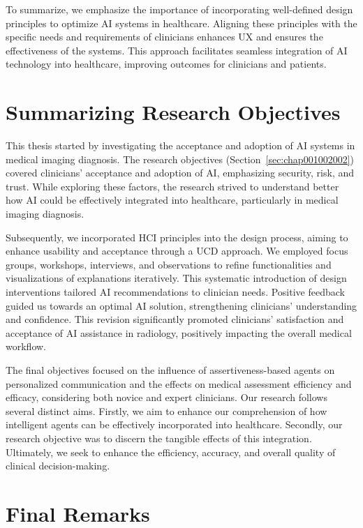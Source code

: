 To summarize, we emphasize the importance of incorporating well-defined design principles to optimize \ac{AI} systems in healthcare.
Aligning these principles with the specific needs and requirements of clinicians enhances \ac{UX} and ensures the effectiveness of the systems.
This approach facilitates seamless integration of \ac{AI} technology into healthcare, improving outcomes for clinicians and patients.

\section{Summarizing Research Objectives}
\label{sec:chap008003}

This thesis started by investigating the acceptance and adoption of \ac{AI} systems in medical imaging diagnosis.
The research objectives (Section~\ref{sec:chap001002002}) covered clinicians' acceptance and adoption of \ac{AI}, emphasizing security, risk, and trust.
While exploring these factors, the research strived to understand better how \ac{AI} could be effectively integrated into healthcare, particularly in medical imaging diagnosis.

Subsequently, we incorporated \ac{HCI} principles into the design process, aiming to enhance usability and acceptance through a \ac{UCD} approach.
We employed focus groups, workshops, interviews, and observations to refine functionalities and visualizations of explanations iteratively.
This systematic introduction of design interventions tailored \ac{AI} recommendations to clinician needs.
Positive feedback guided us towards an optimal \ac{AI} solution, strengthening clinicians' understanding and confidence.
This revision significantly promoted clinicians' satisfaction and acceptance of \ac{AI} assistance in radiology, positively impacting the overall medical workflow.

The final objectives focused on the influence of assertiveness-based agents on personalized communication and the effects on medical assessment efficiency and efficacy, considering both novice and expert clinicians.
Our research follows several distinct aims.
Firstly, we aim to enhance our comprehension of how intelligent agents can be effectively incorporated into healthcare.
Secondly, our research objective was to discern the tangible effects of this integration.
Ultimately, we seek to enhance the efficiency, accuracy, and overall quality of clinical decision-making.

\section{Final Remarks}
\label{sec:chap008004}

